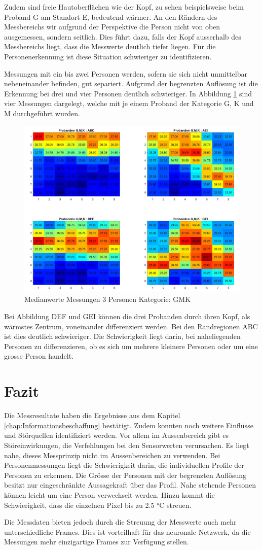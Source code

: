 Zudem sind freie Hautoberflächen wie der Kopf, zu sehen beispielsweise beim Proband G am Standort E, bedeutend wärmer. An den Rändern des Messbereichs wir aufgrund der Perspektive die Person nicht von oben ausgemessen, sondern seitlich. Dies führt dazu, falls der Kopf ausserhalb des Messbereichs liegt, dass die Messwerte deutlich tiefer liegen. Für die Personenerkennung ist diese Situation schwieriger zu identifizieren.

Messungen mit ein bis zwei Personen werden, sofern sie sich nicht unmittelbar nebeneinander befinden, gut separiert. 
Aufgrund der begrenzten Auflösung ist die Erkennung bei drei und vier Personen deutlich schwieriger. In Abbildung \ref{fig:p33x3allpositons} sind vier Messungen dargelegt, welche mit je einem Proband der Kategorie G, K und M durchgeführt wurden.

\begin{figure}[H]
	\centering
	\includegraphics[width=0.8\linewidth]{fig/p3_kkg_4x4.jpg}
	\caption[Medianwerte aus Messungen mit 3 Personen der Kategorie: GMK]{Medianwerte Messungen 3 Personen Kategorie: GMK}
	\label{fig:p33x3allpositons}
\end{figure}


Bei Abbildung DEF und GEI können die drei Probanden durch ihren Kopf, als wärmstes Zentrum, voneinander differenziert werden. Bei den Randregionen ABC ist dies deutlich schwieriger. Die Schwierigkeit liegt darin, bei naheliegenden Personen zu differenzieren, ob es sich um mehrere kleinere Personen oder um eine grosse Person handelt.


\section{Fazit}
Die Messresultate haben die Ergebnisse aus dem Kapitel \ref{chap:Informationsbeschaffung} bestätigt. Zudem konnten noch weitere Einflüsse und Störquellen identifiziert werden. Vor allem im Aussenbereich gibt es Störeinwirkungen, die Verfehlungen bei den Sensorwerten verursachen. Es liegt nahe, dieses Messprinzip nicht im Aussenbereichen zu verwenden.
Bei Personenmessungen liegt die Schwierigkeit darin, die individuellen Profile der Personen zu erkennen. Die Grösse der Personen mit der begrenzten Auflösung besitzt nur eingeschränkte Aussagekraft über das Profil. Nahe stehende Personen können leicht um eine Person verwechselt werden. Hinzu kommt die Schwierigkeit, dass die einzelnen Pixel bis zu 2.5 °C streuen. 

Die Messdaten bieten jedoch durch die Streuung der Messwerte auch mehr unterschiedliche Frames. Dies ist vorteilhaft für das neuronale Netzwerk, da die Messungen mehr einzigartige Frames zur Verfügung stellen.